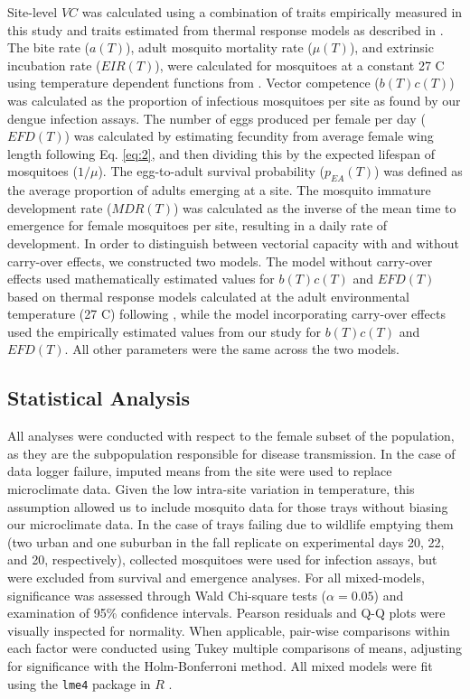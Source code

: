 \documentclass[12pt]{article}
\begin{document}
Site-level $VC$ was calculated using a combination of traits empirically measured in this study and traits estimated from thermal response models as described in \citet{mordecai2017}. The bite rate ($a(T)$), adult mosquito mortality rate ($\mu(T)$), and extrinsic incubation rate ($EIR(T)$), were calculated for mosquitoes at a constant 27 \degree C using temperature dependent functions from \citet{mordecai2017}. Vector competence ($b(T)c(T)$) was calculated as the proportion of infectious mosquitoes per site as found by our dengue infection assays. The number of eggs produced per female per day ($EFD(T)$) was calculated by estimating fecundity from average female wing length following Eq. \ref{eq:2}, and then dividing this by the expected lifespan of mosquitoes ($1/\mu$). The egg-to-adult survival probability ($p_{EA}(T)$) was defined as the average proportion of adults emerging at a site. The mosquito immature development rate ($MDR(T)$) was calculated as the inverse of the mean time to emergence for female mosquitoes per site, resulting in a daily rate of development. In order to distinguish between vectorial capacity with and without carry-over effects, we constructed two models. The model without carry-over effects used mathematically estimated values for $b(T)c(T)$ and $EFD(T)$ based on thermal response models calculated at the adult environmental temperature (27 \degree C) following \citet{mordecai2017}, while the model incorporating carry-over effects used the empirically estimated values from our study for $b(T)c(T)$ and $EFD(T)$. All other parameters were the same across the two models.

\subsection{Statistical Analysis}

All analyses were conducted with respect to the female subset of the population, as they are the subpopulation responsible for disease transmission. In the case of data logger failure, imputed means from the site were used to replace microclimate data. Given the low intra-site variation in temperature, this assumption allowed us to include mosquito data for those trays without biasing our microclimate data. In the case of trays failing due to wildlife emptying them (two urban and one suburban in the fall replicate on experimental days 20, 22, and 20, respectively), collected mosquitoes were used for infection assays, but were excluded from survival and emergence analyses. For all mixed-models, significance was assessed through Wald Chi-square tests ($\alpha=0.05$) and examination of 95\% confidence intervals. Pearson residuals and Q-Q plots were visually inspected for normality. When applicable, pair-wise comparisons within each factor were conducted using Tukey multiple comparisons of means, adjusting for significance with the Holm-Bonferroni method. All mixed models were fit using the \texttt{lme4} \citep{lmePackage} package in $R$ \citep{Rstats2017}.
\end{document}
